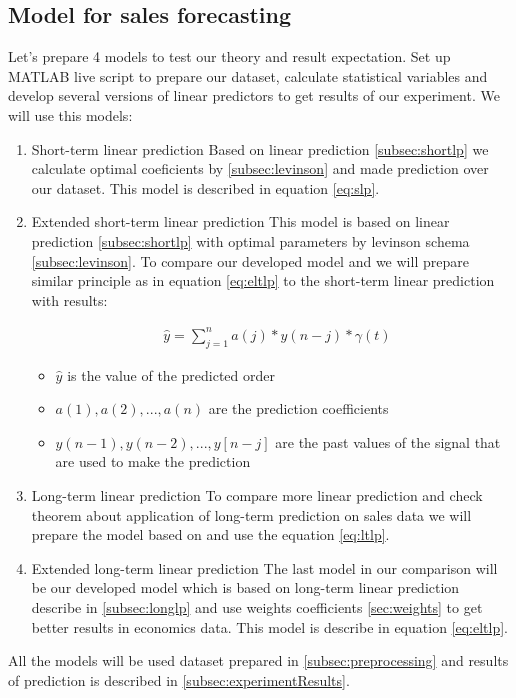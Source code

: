     \subsection{Model for sales forecasting} \label{subsec:calculate_models}
    Let's prepare 4 models to test our theory and result expectation.  Set up MATLAB live script to prepare our dataset,
    calculate statistical variables and develop several versions of linear predictors to get results of our experiment.
    We will use this models:
    \begin{enumerate}
        \item Short-term linear prediction 
        Based on linear prediction \ref{subsec:shortlp} we calculate optimal coeficients by \ref{subsec:levinson} and
        made prediction over our dataset. This model is described in equation \ref{eq:slp}.

        \item Extended short-term linear prediction 
        This model is based on linear prediction \ref{subsec:shortlp} with optimal parameters by levinson
        schema \ref{subsec:levinson}. To compare our developed model \label{subsec:extlonglp} and we will prepare
        similar principle as in equation \ref{eq:eltlp} to the short-term linear prediction with results:
        
        \begin{equation} \label{eq:slp}
            \begin{aligned}
                &\hat{y} = \sum_{j=1}^{n} a(j)*y(n-j) * \gamma(t)
            \end{aligned}
        \end{equation}
        \begin{itemize}
            \item $\hat{y}$ is the value of the predicted order
            \item $a(1), a(2), ..., a(n)$ are the prediction coefficients
            \item $y(n-1), y(n-2), ..., y[n-j]$ are the past values of the signal that are used to make the prediction
        \end{itemize}

        \item Long-term linear prediction 
        To compare more linear prediction and check theorem about application of long-term prediction on sales data
        we will prepare the model based on \label{subsec:longlp} and use the equation \ref{eq:ltlp}.

        \item Extended long-term linear prediction
        The last model in our comparison will be our developed model which is based on long-term linear prediction
        describe in \ref{subsec:longlp} and use weights coefficients \ref{sec:weights} to get better results in
        economics data. This model is describe in equation \ref{eq:eltlp}.
    \end{enumerate}
    All the models will be used dataset prepared in \ref{subsec:preprocessing} and results of prediction is
    described in \ref{subsec:experimentResults}.
